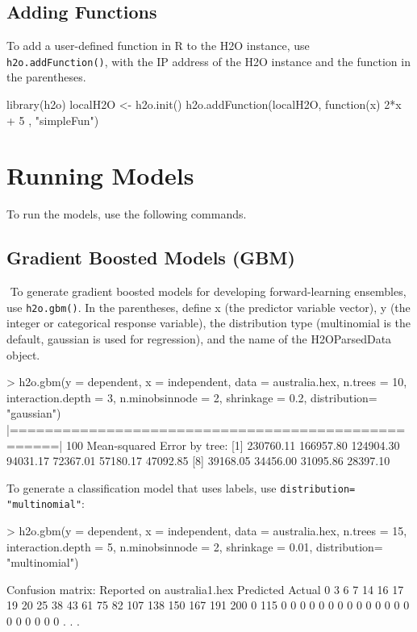 \documentclass[11pt]{article}
\begin{document}
\subsection{Adding Functions}

To add a user-defined function in R to the H2O instance, use {\texttt{h2o.addFunction()}}, with the IP address of the H2O instance and the function in the parentheses.  
\begin{spverbatim}
library(h2o)
localH2O <- h2o.init()
h2o.addFunction(localH2O, function(x) { 2*x + 5 }, "simpleFun")
\end{spverbatim}


\section{Running Models}

To run the models, use the following commands. 
\subsection{Gradient Boosted Models (GBM)}
 To generate gradient boosted models for developing forward-learning ensembles, use {\texttt{h2o.gbm()}}.  In the parentheses, define x (the predictor variable vector), y (the integer or categorical response variable), the distribution type (multinomial is the default, gaussian is used for regression), and the name of the H2OParsedData object. 
\begin{spverbatim}
> h2o.gbm(y = dependent, x = independent, data = australia.hex, n.trees = 10, interaction.depth = 3,
   n.minobsinnode = 2, shrinkage = 0.2, distribution= "gaussian")
     |===================================================| 100%
 Mean-squared Error by tree:
  [1] 230760.11 166957.80 124904.30  94031.17  72367.01  57180.17  47092.85
  [8]  39168.05  34456.00  31095.86  28397.10

\end{spverbatim}

To generate a classification model that uses labels, use {\texttt{distribution= "multinomial"}}: 
\begin{spverbatim}
> h2o.gbm(y = dependent, x = independent, data = australia.hex, n.trees
= 15, interaction.depth = 5,
 n.minobsinnode = 2, shrinkage = 0.01, distribution= "multinomial")
   
Confusion matrix:
Reported on australia1.hex
Predicted
Actual     0 3 6 7 14 16 17 19 20 25 38 43 61 75 82 107 138 150 167 191 200
  0      115 0 0 0  0  0  0  0  0  0  0  0  0  0  0   0   0   0   0   0   0
. . .
\end{spverbatim}
\end{document}
